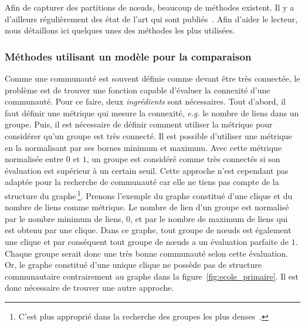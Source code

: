 Afin de capturer des partitions de n\oe uds, beaucoup de méthodes existent.
Il y a d'ailleurs régulièrement des état de l'art qui sont publiés~\cite{Fortunato2010,Plantie2013a, Malliaros2013a, Harenberg2014a}.
Afin d'aider le lecteur, nous détaillons ici quelques unes des méthodes les plus utilisées.

\subsubsection{Méthodes utilisant un modèle pour la comparaison}

Comme une communauté est souvent définie comme devant être très connectée, le problème est de trouver une fonction capable d'évaluer la connexité d'une communauté.
Pour ce faire, deux \emph{ingrédients} sont nécessaires.
Tout d'abord, il faut définir une métrique qui mesure la connexité, \emph{e.g.} le nombre de liens dans un groupe.
Puis, il est nécessaire de définir comment utiliser la métrique pour considérer qu'un groupe est très connecté.
Il est possible d'utiliser une métrique en la normalisant par ses bornes minimum et maximum.
Avec cette métrique normalisée entre $0$ et $1$, un groupe est considéré comme très connectés si son évaluation est supérieur à un certain seuil.
Cette approche n'est cependant pas adaptée pour la recherche de communauté car elle ne tiens pas compte de la structure du graphe\,\footnote{C'est plus approprié dans la recherche des groupes les plus denses~\cite{Balalau2015}.}.
Prenons l'exemple du graphe constitué d'une clique et du nombre de liens comme métrique.
Le nombre de lien d'un groupe est normalisé par le nombre minimum de liens, $0$, et par le nombre de maximum de liens qui est obtenu par une clique.
Dans ce graphe, tout groupe de n\oe uds est également une clique et par conséquent tout groupe de n\oe uds a un évaluation parfaite de $1$.
Chaque groupe serait donc une très bonne communauté selon cette évaluation.
Or, le graphe constitué d'une unique clique ne possède pas de structure communautaire contrairement au graphe dans la figure~\ref{fig:ecole_primaire}.
Il est donc nécessaire de trouver une autre approche.

